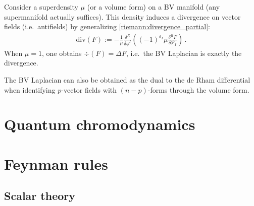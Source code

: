     \begin{property}[Divergence]
        Consider a superdensity $\mu$ (or a volume form) on a BV manifold (any supermanifold actually suffices). This density induces a divergence on vector fields (i.e.~antifields) by generalizing \cref{riemann:divergence_partial}:
        \begin{gather}
            \mathrm{div}(F) := -\frac{1}{\mu}\frac{\delta^R}{\delta\phi^I}\left((-1)^{\varepsilon_I}\mu\frac{\delta^RF}{\delta\mathcal{P}_I}\right)\,.
        \end{gather}
        When $\mu=1$, one obtains $\div(F)=\Delta F$, i.e.~the BV Laplacian is exactly the divergence.
    \end{property}
    \begin{remark}
        The BV Laplacian can also be obtained as the dual to the de Rham differential when identifying $p$-vector fields with $(n-p)$-forms through the volume form.
    \end{remark}

\section{Quantum chromodynamics}\label{section:qcd}


\section{Feynman rules}
\subsection{Scalar theory}

